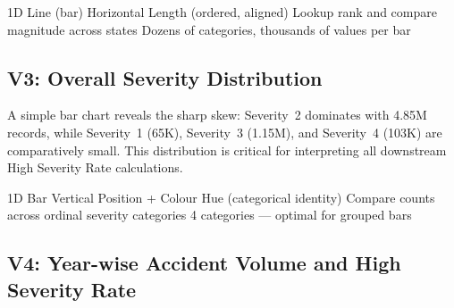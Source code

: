 \begin{figure}[H]
  \centering
  \label{fig:v2}
\end{figure}

\idiomtable
  {1D Line (bar)}
  {Horizontal Length (ordered, aligned)}
  {Lookup rank and compare magnitude across states}
  {Dozens of categories, thousands of values per bar}


\subsection{V3: Overall Severity Distribution}

A simple bar chart reveals the sharp skew: Severity~2 dominates with 4.85M
records, while Severity~1 (65K), Severity~3 (1.15M), and Severity~4 (103K) are
comparatively small. This distribution is critical for interpreting all
downstream High Severity Rate calculations.

\begin{figure}[H]
  \centering
  \label{fig:v3}
\end{figure}

\idiomtable
  {1D Bar}
  {Vertical Position + Colour Hue (categorical identity)}
  {Compare counts across ordinal severity categories}
  {4 categories --- optimal for grouped bars}


\subsection{V4: Year-wise Accident Volume and High Severity Rate}

